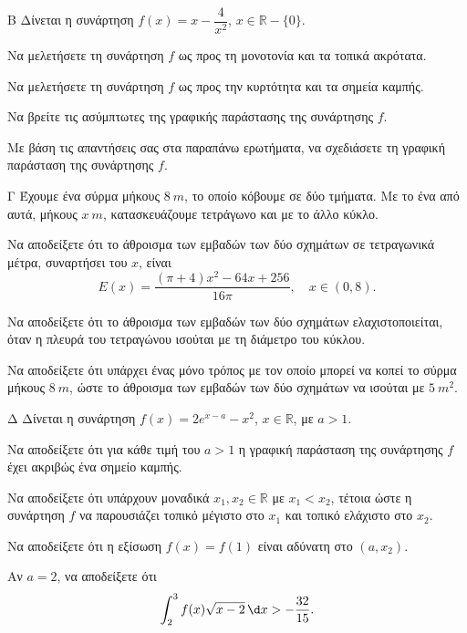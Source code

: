 \begin{thema}{Β}
Δίνεται η συνάρτηση $f(x) = x - \dfrac{4}{x^2}$, $x \in \mathbb{R} - \{0\}$.
\begin{erwthma}
    \item Να μελετήσετε τη συνάρτηση $f$ ως προς τη μονοτονία και τα τοπικά ακρότατα. 
    \item Να μελετήσετε τη συνάρτηση $f$ ως προς την κυρτότητα και τα σημεία καμπής. 
    \item Να βρείτε τις ασύμπτωτες της γραφικής παράστασης της συνάρτησης $f$. 
    \item Με βάση τις απαντήσεις σας στα παραπάνω ερωτήματα, να σχεδιάσετε τη γραφική παράσταση της συνάρτησης $f$. 
\end{erwthma}
\end{thema}
\begin{thema}{Γ}
Έχουμε ένα σύρμα μήκους $8\ \si{m}$, το οποίο κόβουμε σε δύο τμήματα. Με το ένα από αυτά, μήκους $x\ \si{m}$, κατασκευάζουμε τετράγωνο και με το άλλο κύκλο.
\begin{erwthma}
    \item Να αποδείξετε ότι το άθροισμα των εμβαδών των δύο σχημάτων σε τετραγωνικά μέτρα, συναρτήσει του $x$, είναι
    \[
    E(x) = \frac{(\pi + 4)x^2 - 64x + 256}{16\pi}, \quad x \in (0, 8).
    \]
    \item Να αποδείξετε ότι το άθροισμα των εμβαδών των δύο σχημάτων ελαχιστοποιείται, όταν η πλευρά του τετραγώνου ισούται με τη διάμετρο του κύκλου. 
    \item Να αποδείξετε ότι υπάρχει ένας μόνο τρόπος με τον οποίο μπορεί να κοπεί το σύρμα μήκους $8\ \si{m}$, ώστε το άθροισμα των εμβαδών των δύο σχημάτων να ισούται με $5\ \si{m}^2$. 
\end{erwthma}
\end{thema}
\begin{thema}{Δ}
Δίνεται η συνάρτηση $f(x) = 2e^{x-a} - x^2$, $x \in \mathbb{R}$, με $a > 1$.
\begin{erwthma}
    \item Να αποδείξετε ότι για κάθε τιμή του $a > 1$ η γραφική παράσταση της συνάρτησης $f$ έχει ακριβώς ένα σημείο καμπής. 
    \item Να αποδείξετε ότι υπάρχουν μοναδικά $x_1, x_2 \in \mathbb{R}$ με $x_1 < x_2$, τέτοια ώστε η συνάρτηση $f$ να παρουσιάζει τοπικό μέγιστο στο $x_1$ και τοπικό ελάχιστο στο $x_2$. 
    \item Να αποδείξετε ότι η εξίσωση $f(x) = f(1)$ είναι αδύνατη στο $(a, x_2)$. 
    \item Αν $a = 2$, να αποδείξετε ότι
    \[
    \int_2^3 f(x)\sqrt{x-2}\,\d x > -\frac{32}{15}.
    \]
\end{erwthma}
\end{thema}

